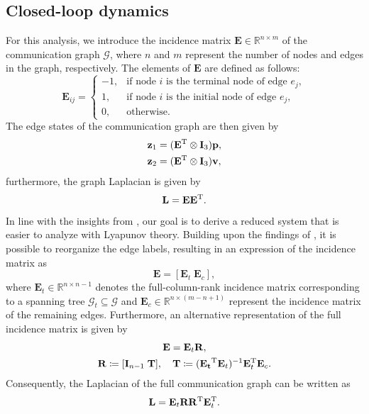 \subsection{Closed-loop dynamics}
  For this analysis, we introduce the incidence matrix $\mathbf{E} \in \mathbb{R}^{n\times m}$ of the communication graph $\mathcal{G}$, where $n$ and $m$ represent the number of nodes and edges in the graph, respectively. The elements of $\mathbf{E}$ are defined as follows:
\begin{equation}
    \mathbf{E}_{ij} = \begin{cases}
        -1, & \textrm{if node } i \textrm{ is the terminal node of edge } e_j,\\
        1, & \textrm{if node } i \textrm{ is the initial node of edge } e_j,\\
        0, & \textrm{otherwise}.
    \end{cases}
\end{equation}
The edge states of the communication graph are then given by
\begin{subequations}
\begin{align}
    \mathbf{z}_1 &= (\mathbf{E}^{\rm T}\otimes \mathbf{I}_3)\mathbf{p},\\
    \mathbf{z}_2 &= (\mathbf{E}^{\rm T}\otimes \mathbf{I}_3) \mathbf{v},
\end{align}
\end{subequations}
furthermore, the graph Laplacian is given by
\begin{equation}
    \mathbf{L} = \mathbf{E}\mathbf{E}^{\rm T}.
\end{equation}

In line with the insights from \cite{restrepo_tracking--formation_2022}, our goal is to derive a reduced system that is easier to analyze with Lyapunov theory. Building upon the findings of \cite{zelazo_agreement_2007}, it is possible to reorganize the edge labels, resulting in an expression of the incidence matrix as
\begin{equation}
    \mathbf{E} = [\mathbf{E}_t\; \mathbf{E}_c],
\end{equation}
where $\mathbf{E}_t \in \mathbb{R}^{n\times n-1}$ denotes the full-column-rank incidence matrix corresponding to a spanning tree $\mathcal{G}_t \subseteq \mathcal{G}$ and $\mathbf{E}_c \in \mathbb{R}^{n\times(m-n+1)}$ represent the incidence matrix of the remaining edges. Furthermore, an alternative representation of the full incidence matrix is given by
\begin{gather}
    \mathbf{E} = \mathbf{E}_t \mathbf{R},\\
    \mathbf{R} \coloneqq [\mathbf{I}_{n-1} \;\mathbf{T}],\quad \mathbf{T} \coloneqq (\mathbf{E_t}^{\rm T}\mathbf{E}_t)^{-1} \mathbf{E}_t^{\rm T} \mathbf{E}_c.
\end{gather}
Consequently, the Laplacian of the full communication graph can be written as
\begin{equation}\label{eq:laplacian_alternative}
    \mathbf{L} = \mathbf{E}_t\mathbf{R}\mathbf{R}^{\rm T} \mathbf{E}_t^{\rm T}.
\end{equation}


